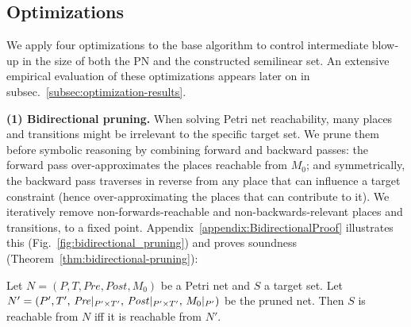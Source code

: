 %


\subsection{Optimizations}
\label{sec:optimizations}


We apply four optimizations to the base algorithm to control intermediate blow‐up in the size of both the PN and the constructed semilinear set. 
%
An extensive empirical evaluation of these optimizations appears later on in subsec.~\ref{subsec:optimization-results}.

\medskip
\noindent
\textbf{(1) Bidirectional pruning.}  
When solving Petri net reachability, many places and transitions might be irrelevant to the specific target set.  
	We prune them before symbolic reasoning by combining forward and backward passes:  
	the forward pass over-approximates the places reachable from $M_0$; and symmetrically,   
	the backward pass traverses in reverse from any place that can influence a target constraint (hence over-approximating the places that can contribute to it).
	We iteratively remove non-forwards-reachable and
	non-backwards-relevant places and transitions, to a fixed point.  
	Appendix~\ref{appendix:BidirectionalProof} illustrates this (Fig.~\ref{fig:bidirectional_pruning}) and proves soundness (Theorem~\ref{thm:bidirectional-pruning}):



\begin{theorem}
	\label{thm:bidirectional-pruning}
	Let $N = (P, T, Pre, Post, M_0)$ be a Petri net and $S$ a target set.  
	Let $N' = (P',T',\,\mathit{Pre}|_{P'\times T'},\,\mathit{Post}|_{P'\times T'},\,M_0|_{P'})$ be the pruned net.  
	Then $S$ is reachable from $N$ iff it is reachable from $N'$.
\end{theorem}
%
%

